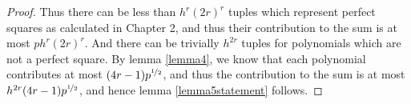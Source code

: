 \documentclass{report}
\begin{document}
\begin{proof}
Thus there can be less than $h^r(2r)^r$ tuples which represent perfect squares as calculated in Chapter 2, and thus their contribution to the sum is at most $ph^r(2r)^r$. And there can be trivially $h^{2r}$ tuples for polynomials which are not a perfect square. By lemma \ref{lemma4}, we know that each polynomial contributes at most $(4r-1)p^{\nicefrac{1}{2}}$, and thus the contribution to the sum is at most $h^{2r}(4r-1)p^{\nicefrac{1}{2}}$, and hence lemma \ref{lemma5statement} follows.
%
\begin{comment}
A factor will occur in an even power when each multiplicative term in the expanded representation (each term has a power of exactly 1) $(x+a+m_1)(x+b+m_1) (x+a+m_2)(x+b+m_2) ...(x+a+m_{2r}) (x+b+m_{2r})$ can be paired with another term, such that both terms evaluate to the same linear polynomial when substituted with the $m$ additive term in them. Say a generic pair of terms is $(x+c_i+m_i)$ and $(x+c_j+m_j)$, where $c_i$ and $c_j$ each stand for whichever of $a$ or $b$ occurs in the respective paired term. The pair can occur in two ways:
\begin{itemize}
    \item $c_i=c_j$ and thus $m_i=m_j$, i.e. $(x+a+m_i)=(x+a+m_j)$ or $(x+b+m_i)=(x+b+m_j)$
    \item $c_i\neq c_j$, and thus $(x+a+m_i)=(x+b+m_j)$ or $(x+b+m_i)=(x+a+m_j)$
\end{itemize}

add factorizable means completely factorizable in intro
\end{comment}
\end{proof}
%
%
\end{document}
